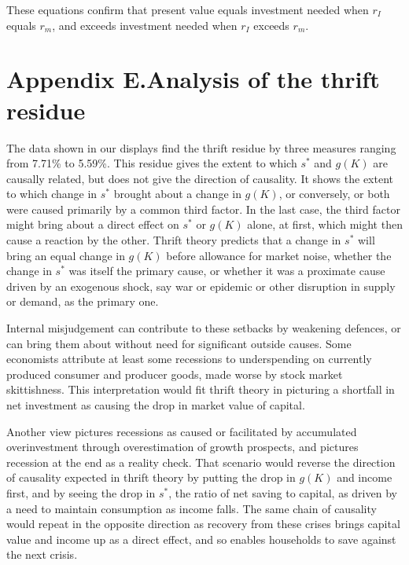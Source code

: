 \documentclass[a4padisinvitingper,fleqn]{latex_styles/cas-sc}
\begin{document}
These equations confirm that present value equals investment needed when \(r_I\) equals \(r_m\), and exceeds investment needed when \(r_I\) exceeds \(r_m\). 

\renewcommand{\theequation}{E.\arabic{equation}}
\setcounter{equation}{0}

\hypertarget{appendix-e}{%
\section*{Appendix E.\hspace{0.5em}Analysis of the thrift residue}\label{appendix-e}}

The data shown in our displays find the thrift residue by three measures ranging from 7.71\% to 5.59\%. This residue gives the extent to which \(s^*\) and \(g(K)\) are causally related, but does not give the direction of causality. It shows the extent to which change in \(s^*\) brought about a change in \(g(K)\), or conversely, or both were caused primarily by a common third factor. In the last case, the third factor might bring about a direct effect on \(s^*\) or \(g(K)\) alone, at first, which might then cause a reaction by the other. Thrift theory predicts that a change in \(s^*\) will bring an equal change in \(g(K)\) before allowance for market noise, whether the change in \(s^*\) was itself the primary cause, or whether it was a proximate cause driven by an exogenous shock, say war or epidemic or other disruption in supply or demand, as the primary one.

Internal misjudgement can contribute to these setbacks by weakening defences, or can bring them about without need for significant outside causes. Some economists attribute at least some recessions to underspending on currently produced consumer and producer goods, made worse by stock market skittishness. This interpretation would fit thrift theory in picturing a shortfall in net investment as causing the drop in market value of capital.

Another view pictures recessions as caused or facilitated by accumulated overinvestment through overestimation of growth prospects, and pictures recession at the end as a reality check. That scenario would reverse the direction of causality expected in thrift theory by putting the drop in \(g(K)\) and income first, and by seeing the drop in \(s^*\), the ratio of net saving to capital, as driven by a need to maintain consumption as income falls. 
The same chain of causality would repeat in the opposite direction as recovery from these crises  brings capital value and income up as a direct effect, and so enables households to save against the next crisis.
\end{document}
